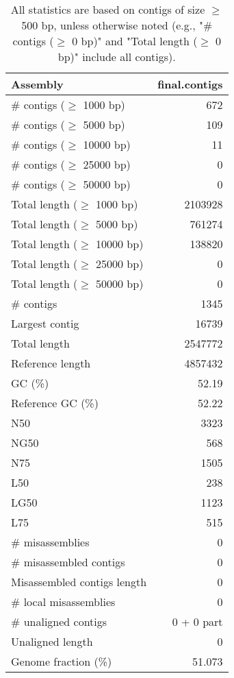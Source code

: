 \documentclass[12pt,a4paper]{article}
\begin{document}
\begin{table}[ht]
\begin{center}
\caption{All statistics are based on contigs of size $\geq$ 500 bp, unless otherwise noted (e.g., "\# contigs ($\geq$ 0 bp)" and "Total length ($\geq$ 0 bp)" include all contigs).}
\begin{tabular}{|l*{1}{|r}|}
\hline
Assembly & final.contigs \\ \hline
\# contigs ($\geq$ 1000 bp) & 672 \\ \hline
\# contigs ($\geq$ 5000 bp) & 109 \\ \hline
\# contigs ($\geq$ 10000 bp) & 11 \\ \hline
\# contigs ($\geq$ 25000 bp) & 0 \\ \hline
\# contigs ($\geq$ 50000 bp) & 0 \\ \hline
Total length ($\geq$ 1000 bp) & 2103928 \\ \hline
Total length ($\geq$ 5000 bp) & 761274 \\ \hline
Total length ($\geq$ 10000 bp) & 138820 \\ \hline
Total length ($\geq$ 25000 bp) & 0 \\ \hline
Total length ($\geq$ 50000 bp) & 0 \\ \hline
\# contigs & 1345 \\ \hline
Largest contig & 16739 \\ \hline
Total length & 2547772 \\ \hline
Reference length & 4857432 \\ \hline
GC (\%) & 52.19 \\ \hline
Reference GC (\%) & 52.22 \\ \hline
N50 & 3323 \\ \hline
NG50 & 568 \\ \hline
N75 & 1505 \\ \hline
L50 & 238 \\ \hline
LG50 & 1123 \\ \hline
L75 & 515 \\ \hline
\# misassemblies & 0 \\ \hline
\# misassembled contigs & 0 \\ \hline
Misassembled contigs length & 0 \\ \hline
\# local misassemblies & 0 \\ \hline
\# unaligned contigs & 0 + 0 part \\ \hline
Unaligned length & 0 \\ \hline
Genome fraction (\%) & 51.073 \\ \hline

\end{tabular}
\end{center}
\end{table}
\end{document}
